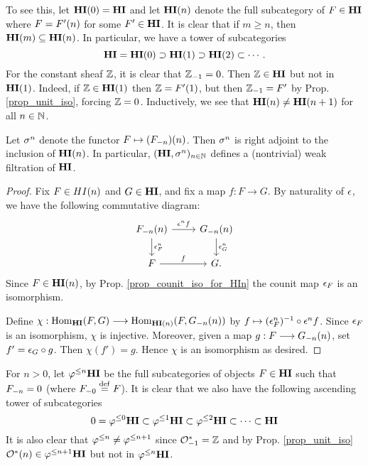 To see this, let $\LHI[0]{\HI} = \HI$ and let $\LHI[n]{\HI}$ 
denote the full subcategory of $F \in \HI$ where $F = \LHI[n]{F'}$ 
for some $F' \in \HI$. It is clear that if $m \geq n$, then 
$\LHI[m]{\HI} \subseteq \LHI[n]{\HI}$. In particular, we have a 
tower of subcategories
\[
\HI = \LHI[0]{\HI} \supset \LHI[1]{\HI} \supset \LHI[2]{\HI} 
\subset \cdots.
\]
For the constant sheaf $\Z$, it is clear that $\RHI{\Z} = 0$. 
Then $\Z \in \HI$ but not in $\LHI{\HI}$. Indeed, if $\Z \in 
\LHI{\HI}$ then $\Z = \LHI{F'}$, but then $\RHI{\Z} = F'$ by Prop. 
\ref{prop_unit_iso}, forcing $\Z = 0$. Inductively, we see 
that $\LHI[n]{\HI} \neq \LHI[n + 1]{\HI}$ for all $n \in \N$.

\begin{prop}
Let $\sgHI{n}$ denote the functor $F \mapsto 
\LHI[n]{(\RHI[n]{F})}$. Then $\sgHI{n}$ is right adjoint to the 
inclusion of $\LHI[n]{\HI}$. In particular, $(\HI, \sgHI{n})_{n 
\in \N}$ defines a (nontrivial) weak filtration of $\HI$.
\end{prop}
\begin{proof}
Fix $F \in \LHI[n]{HI}$ and $G \in \HI$, and fix a map $f : 
F \to G$. By naturality of $\cuHI$, we have the following 
commutative diagram:
\[
\begin{tikzcd}
\LHI[n]{\RHI[n]{F}} \arrow{r}{\cuHI^n f}\arrow{d}{\cuHI^n_F} 
& \LHI[n]{\RHI[n]{G}} \arrow{d}{\cuHI^n_G} \\
F \arrow{r}{f}
& G.
\end{tikzcd}
\]
Since $F \in \LHI[n]{\HI}$, by Prop. \ref{prop_counit_iso_for_HIn} 
the counit map $\cuHI_F$ is an isomorphism.

Define $\chi: \homHI(F, G) \to \hom_{\LHI[n]{\HI}}(F, 
\LHI[n]{\RHI[n]{G}})$ by $f \mapsto (\cuHI^n_F)^{-1} \comp \cuHI^n 
f$. Since $\cuHI_F$ is an isomorphism, $\chi$ is injective. 
Moreover, given a map $g: F \to \LHI[n]{\RHI[n]{G}}$, set $f' = 
\cuHI_G \comp g$. Then $\chi(f') = g$. Hence $\chi$ is an 
isomorphism as desired.
\end{proof}

For $n > 0$, let $\tlHI{n}\HI$ be the full subcategories of 
objects $F \in \HI$ such that $\RHI[n]{F} = 0$ (where $\RHI[0]{F} 
\defeq F$). It is clear that we also have the following ascending 
tower of subcategories
\[
0 = \tlHI{0}\HI \subset \tlHI{1}\HI \subset \tlHI{2}\HI \subset 
   \cdots \subset \HI
\]
It is also clear that $\tlHI{n} \neq \tlHI{n + 1}$ since 
$\RHI{\Ox} = \Z$ and by Prop. \ref{prop_unit_iso} $\LHI[n]{\Ox} 
\in \tlHI{n + 1}\HI$ but not in $\tlHI{n}\HI$.

